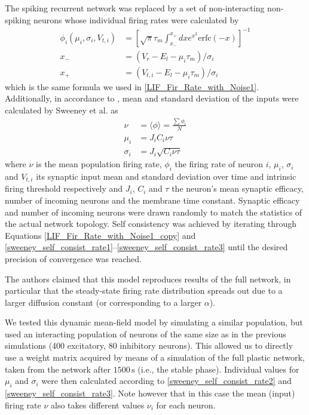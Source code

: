\documentclass[10pt,a4paper]{article}
\begin{document}
The spiking recurrent network was replaced by a set of non-interacting non-spiking neurons whose individual firing rates were calculated by
\begin{align}
\phi_i(\mu_i,\sigma_i,V_{t,i}) &= \left[ \sqrt{\pi}\tau_m \int_{x_-}^{x_+} dx e^{x^2} \mathrm{erfc}(-x) \right]^{-1} \label{LIF_Fir_Rate_with_Noise1_copy}\\
x_- &= (V_r-E_l-\mu_i\tau_m)/\sigma_i \label{LIF_Fir_Rate_with_Noise2_copy}\\
x_+ &= (V_{t,i}-E_l-\mu_i\tau_m)/\sigma_i \label{LIF_Fir_Rate_with_Noise3_copy}
\end{align}
which is the same formula we used in \eqref{LIF_Fir_Rate_with_Noise1}. Additionally, in accordance to \cite{Roxin_Firing_Rate_Distribution}, mean and standard deviation of the inputs were calculated by Sweeney et al. as
\begin{align}
\nu &= \langle \phi \rangle = \frac{\sum \phi_i}{N} \label{sweeney_self_consist_rate1} \\
\mu_i &= J_iC_i\nu \tau \label{sweeney_self_consist_rate2} \\
\sigma_i &= J_i\sqrt{C_i\nu  \tau} \label{sweeney_self_consist_rate3}
\end{align}
where $\nu$ is the mean population firing rate, $\phi_i$ the firing rate of neuron $i$, $\mu_i$, $\sigma_i$ and $V_{t,i}$ its synaptic input mean and standard deviation over time and intrinsic firing threshold respectively and $J_i$, $C_i$ and $\tau$ the neuron's mean synaptic efficacy, number of incoming neurons and the membrane time constant. Synaptic efficacy and number of incoming neurons were drawn randomly to match the statistics of the actual network topology. Self consistency was achieved by iterating through Equations \eqref{LIF_Fir_Rate_with_Noise1_copy} and \eqref{sweeney_self_consist_rate1}--\eqref{sweeney_self_consist_rate3} until the desired precision of convergence was reached.

The authors claimed that this model reproduces results of the full network, in particular that the steady-state firing rate distribution spreads out due to a larger diffusion constant (or corresponding to a larger $\alpha$).

We tested this dynamic mean-field model by simulating a similar population, but used an interacting population of neurons of the same size as in the previous simulations (400 excitatory, 80 inhibitory neurons). This allowed us to directly use a weight matrix acquired by means of a simulation of the full plastic network, taken from the network after $\mathrm{1500 \, s}$ (i.e., the stable phase).
Individual values for $\mu_i$ and $\sigma_i$ were then calculated according to \eqref{sweeney_self_consist_rate2} and \eqref{sweeney_self_consist_rate3}. Note however that in this case the mean (input) firing rate $\nu$ also takes different values $\nu_i$ for each neuron.
\end{document}
